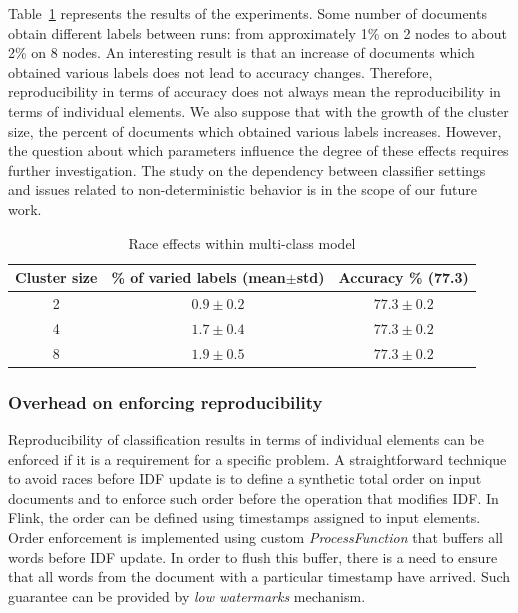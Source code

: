 Table~\ref{race_table} represents the results of the experiments. Some number of documents obtain different labels between runs: from approximately 1\% on 2 nodes to about 2\% on 8 nodes. An interesting result is that an increase of documents which obtained various labels does not lead to accuracy changes. Therefore, reproducibility in terms of accuracy does not always mean the reproducibility in terms of individual elements. We also suppose that with the growth of the cluster size, the percent of documents which obtained various labels increases. However, the question about which parameters influence the degree of these effects requires further investigation. The study on the dependency between classifier settings and issues related to non-deterministic behavior is in the scope of our future work.

\begin{table}[htbp]
\caption{Race effects within multi-class model}
\begin{threeparttable}
\begin{tabular}{ccc}
Cluster size    & \% of varied labels (mean$\pm$std) & Accuracy \% (77.3)   \\
\hline
2   &   $0.9\pm0.2$    &   $77.3\pm0.2$    \\
4   &   $1.7\pm0.4$    &   $77.3\pm0.2$    \\
8   &   $1.9\pm0.5$    &   $77.3\pm0.2$    \\
\end{tabular}
\end{threeparttable}
\label{race_table}
\end{table}

\subsubsection{Overhead on enforcing reproducibility}

Reproducibility of classification results in terms of individual elements can be enforced if it is a requirement for a specific problem. A straightforward technique to avoid races before IDF update is to define a synthetic total order on input documents and to enforce such order before the operation that modifies IDF. In Flink, the order can be defined using timestamps assigned to input elements. Order enforcement is implemented using custom {\it ProcessFunction} that buffers all words before IDF update. In order to flush this buffer, there is a need to ensure that all words from the document with a particular timestamp have arrived. Such guarantee can be provided by {\em low watermarks} mechanism. 

